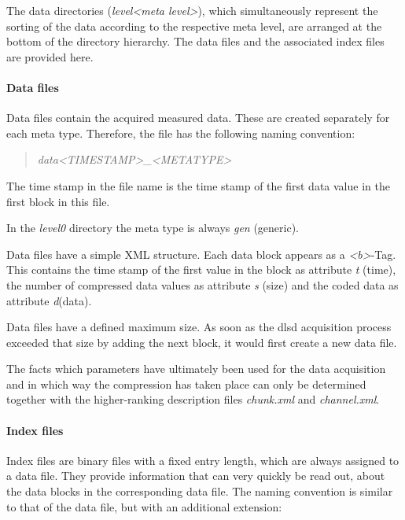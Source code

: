 \documentclass[a4paper,12pt,BCOR6mm,bibtotoc,idxtotoc]{scrbook}
\begin{document}
The data directories (\textit{level\textless meta level\textgreater}), which simultaneously represent the sorting of the data according to the respective meta level, are arranged at the bottom of the directory hierarchy. The data files and the associated index files are provided here.

\paragraph{Data files} Data files contain the acquired measured data. These are created separately for each meta type. Therefore, the file has the following naming convention:

\begin{quote} \textit{data\textless TIMESTAMP\textgreater\_\textless METATYPE\textgreater} \end{quote}

The time stamp in the file name is the time stamp of the first data value in the first block in this file.

In the \textit{level0} directory the meta type is always \textit{gen} (\glqq generic\grqq).

Data files have a simple XML structure. Each data block appears as a \textit{\textless b\textgreater}-Tag. This contains the time stamp of the first value in the block as attribute \textit{t} (\glqq time\grqq), the number of compressed data values as attribute \textit{s} (\glqq size\grqq) and the coded data as attribute \textit{d}(\glqq data\grqq).

Data files have a defined maximum size. As soon as the dlsd acquisition process exceeded that size by adding the next block, it would first create a new data file.

The facts which parameters have ultimately been used for the data acquisition and in which way the compression has taken place can only be determined together with the higher-ranking description files \textit{chunk.xml} and \textit{channel.xml}.

\paragraph{Index files} Index files are binary files with a fixed entry length, which are always assigned to a data file. They provide information that can very quickly be read out, about the data blocks in the corresponding data file. The naming convention is similar to that of the data file, but with an additional extension:
\end{document}

